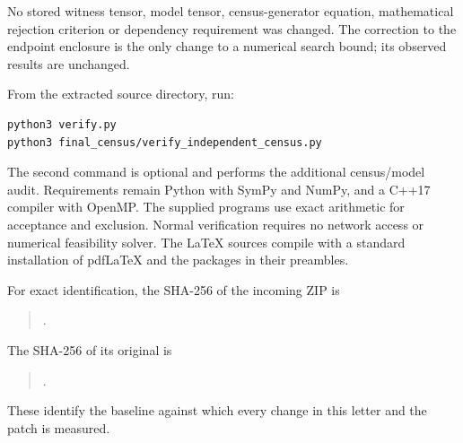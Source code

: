\documentclass[11pt,a4paper]{article}
\begin{document}
No stored witness tensor, model tensor, census-generator equation,
mathematical rejection criterion or dependency requirement was changed.
The correction to the endpoint enclosure is the only change to a
numerical search bound; its observed results are unchanged.

From the extracted source directory, run:
\begin{verbatim}
python3 verify.py
python3 final_census/verify_independent_census.py
\end{verbatim}
The second command is optional and performs the additional census/model
audit. Requirements remain Python with SymPy and NumPy, and a C++17
compiler with OpenMP. The supplied programs use exact arithmetic for
acceptance and exclusion. Normal verification requires no network access
or numerical feasibility solver. The LaTeX sources compile with a
standard installation of pdfLaTeX and the packages in their preambles.

For exact identification, the SHA-256 of the incoming ZIP is
\begin{quote}\small\raggedright{}.
\end{quote}
The SHA-256 of its original  is
\begin{quote}\small\raggedright{}.
\end{quote}
These identify the baseline against which every change in this letter
and the patch is measured.
\end{document}
